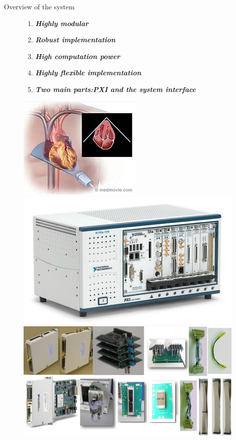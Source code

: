 \documentclass[t,12pt,english
\ifx\beamermode\undefined\else,\beamermode\fi
]{beamer}
\begin{document}
\begin{frame}{Overview of the system}


\begin{figure}[!htb]
\begin{block}{\footnotesize{}}\tiny{}
\begin{enumerate} 
\vspace{0.05cm}
     \item \tiny{\textbf{\textit{Highly modular }}} 
     \item \tiny{\textbf{\textit{Robust implementation}}} 
     \item \tiny{\textbf{\textit{High computation power}}} 
     \item \tiny{\textbf{\textit{Highly flexible implementation}}} 
     \item \tiny{\textbf{\textit{Two main parts:PXI and the system interface}}} 
\end{enumerate}
\end{block}

\includegraphics[width=.6\textwidth]{36.jpg}
\endminipage
{}
\centering
\includegraphics[width=.65\textwidth]{35.png}\\
\includegraphics[width=.91\textwidth]{20.png}
\endminipage
\end{figure}

\end{frame}
\end{document}
